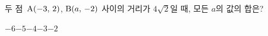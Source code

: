 두 점~$\mathrm{A}(-3,\,2)$, $\mathrm{B}(a,\,-2)$ 사이의 거리가 $4\sqrt{2}$일 때, 모든 $a$의 값의 합은?
\begin{choices32}{$-6$}{$-5$}{$-4$}{$-3$}{$-2$}\end{choices32}
